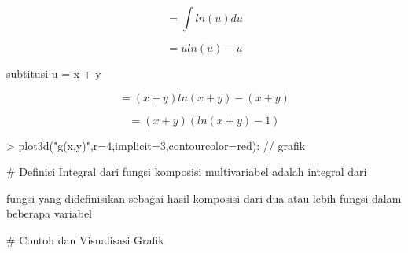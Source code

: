 \documentclass[a4paper,10pt]{article}
\begin{document}
\begin{eulernotebook}
\begin{eulercomment}
\begin{eulercomment}
\begin{eulercomment}
\begin{eulercomment}
\begin{eulercomment}
\begin{eulercomment}
\begin{eulercomment}
\begin{eulercomment}
\begin{eulercomment}
\begin{eulercomment}
\begin{eulercomment}
\begin{eulercomment}
\begin{eulercomment}
\begin{eulercomment}
\begin{eulerformula}
\[\]
\end{eulerformula}
\begin{eulercomment}
\end{eulercomment}
\begin{eulerformula}
\[
= \int ln(u) du
\]
\end{eulerformula}
\begin{eulercomment}
\end{eulercomment}
\begin{eulerformula}
\[
= uln(u) - u
\]
\end{eulerformula}
\begin{eulercomment}
\end{eulercomment}
\begin{eulerttcomment}
   subtitusi u = x + y
\end{eulerttcomment}
\begin{eulerformula}
\[
= (x + y) ln(x + y) - (x + y)
\]
\end{eulerformula}
\begin{eulercomment}
\end{eulercomment}
\begin{eulerformula}
\[
= (x + y) (ln(x + y) - 1)
\]
\end{eulerformula}
\begin{eulerprompt}
> plot3d("g(x,y)",r=4,implicit=3,contourcolor=red): // grafik
\end{eulerprompt}
\begin{eulercomment}
\begin{eulercomment}
\begin{eulercomment}
\end{eulercomment}
\begin{eulerttcomment}
 # Definisi
   Integral dari fungsi komposisi multivariabel adalah integral dari
\end{eulerttcomment}
\begin{eulercomment}
fungsi yang didefinisikan sebagai hasil komposisi dari dua atau lebih
fungsi dalam beberapa variabel

\end{eulercomment}
\begin{eulerttcomment}
 # Contoh dan Visualisasi Grafik
\end{eulerttcomment}
\begin{eulercomment}


\end{eulercomment}
\end{eulercomment}
\end{eulercomment}
\end{eulercomment}
\end{eulercomment}
\end{eulercomment}
\end{eulercomment}
\end{eulercomment}
\end{eulercomment}
\end{eulercomment}
\end{eulercomment}
\end{eulercomment}
\end{eulercomment}
\end{eulercomment}
\end{eulercomment}
\end{eulercomment}
\end{eulercomment}
\end{eulernotebook}
\end{document}
